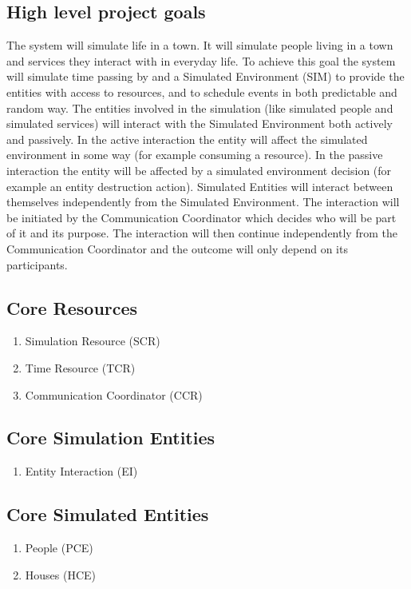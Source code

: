\subsection{High level project goals} 
The system will simulate life in a town. It will simulate people living in a
town and services they interact with in everyday life. 
To achieve this goal the system will simulate time passing by and a Simulated
Environment (SIM) to provide the entities with access to resources, and to
schedule events in both predictable and random way.
The entities involved in the simulation (like simulated people and simulated
services) will interact with the Simulated Environment both actively and
passively. 
In the active interaction the entity will affect the simulated environment in
some way (for example consuming a resource). 
In the passive interaction the entity will be affected by a simulated
environment decision (for example an entity destruction action).
Simulated Entities will interact between themselves independently from the
Simulated Environment. The interaction will be initiated by the Communication
Coordinator which decides who will be part of it and its purpose. The
interaction will then continue independently from the Communication Coordinator
and the outcome will only depend on its participants. 

\subsection{Core Resources} 
\begin{enumerate}
\item Simulation Resource (SCR)
\item Time Resource (TCR)
\item Communication Coordinator (CCR)
\end{enumerate}

\subsection{Core Simulation Entities} 
\begin{enumerate}
\item Entity Interaction (EI)
\end{enumerate}

\subsection{Core Simulated Entities} 
\begin{enumerate}
\item People (PCE)
\item Houses (HCE)
\end{enumerate}

